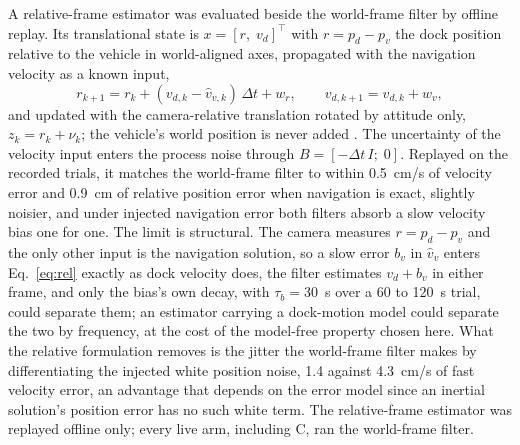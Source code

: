 A relative-frame estimator was evaluated beside the world-frame filter by offline replay. Its translational state is $x = [r,\; v_d]^\top$ with $r = p_d - p_v$ the dock position relative to the vehicle in world-aligned axes, propagated with the navigation velocity as a known input,
\begin{equation}
r_{k+1} = r_k + (v_{d,k} - \hat{v}_{v,k})\,\Delta t + w_r,\qquad v_{d,k+1} = v_{d,k} + w_v,
\label{eq:rel}
\end{equation}
and updated with the camera-relative translation rotated by attitude only, $z_k = r_k + \nu_k$; the vehicle's world position is never added \cite{kim2007relative}. The uncertainty of the velocity input enters the process noise through $B = [-\Delta t\,I;\; 0]$. Replayed on the recorded trials, it matches the world-frame filter to within 0.5~cm/s of velocity error and 0.9~cm of relative position error when navigation is exact, slightly noisier, and under injected navigation error both filters absorb a slow velocity bias one for one. The limit is structural. The camera measures $r = p_d - p_v$ and the only other input is the navigation solution, so a slow error $b_v$ in $\hat{v}_v$ enters Eq.~\eqref{eq:rel} exactly as dock velocity does, the filter estimates $v_d + b_v$ in either frame, and only the bias's own decay, with $\tau_b = 30$~s over a 60 to 120~s trial, could separate them; an estimator carrying a dock-motion model could separate the two by frequency, at the cost of the model-free property chosen here. What the relative formulation removes is the jitter the world-frame filter makes by differentiating the injected white position noise, 1.4 against 4.3~cm/s of fast velocity error, an advantage that depends on the error model since an inertial solution's position error has no such white term. The relative-frame estimator was replayed offline only; every live arm, including C, ran the world-frame filter.
